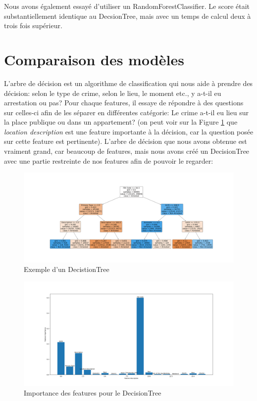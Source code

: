 \documentclass{article}
\begin{document}
    Nous avons également essayé d'utiliser un RandomForestClassifier. 
    Le score était substantiellement identique au DecsionTree, mais avec un temps de 
    calcul deux à trois fois supérieur.

    \section{Comparaison des modèles}

    L'arbre de décision est un algorithme de classification qui nous aide 
    à prendre des décision:
    selon le type de crime, selon le lieu, le moment etc., y a-t-il eu arrestation ou pas?
    Pour chaque features, il essaye de répondre à des questions sur celles-ci afin
    de les séparer en différentes catégorie:
    Le crime a-t-il eu lieu sur la place publique ou dans un appartement?
    (on peut voir sur la Figure \ref{D} que \textit{location description} est une feature
    importante à la décision, car la question posée sur cette feature est pertinente).
    L'arbre de décision que nous avons obtenue est vraiment grand, car beaucoup de
    features, mais nous avons créé un DecisionTree avec une partie restreinte de
    nos features afin de pouvoir le regarder: %

    \begin{figure}[H]
            \centering
	    \includegraphics[scale=.18]{images/treeExample.png}
	    \caption{Exemple d'un DecistionTree}
    \end{figure}
    \begin{figure}[H]
            \centering
	    \includegraphics[scale=.3]{images/feature_importance.png}
	    \caption{Importance des features pour le DecisionTree}
	    \label{D}
    \end{figure}
\end{document}
